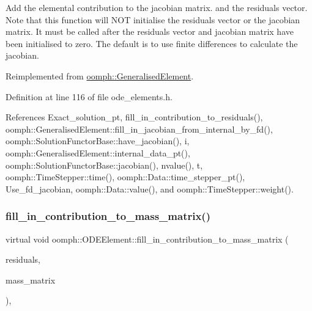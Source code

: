 Add the elemental contribution to the jacobian matrix. and the residuals vector. Note that this function will N\+OT initialise the residuals vector or the jacobian matrix. It must be called after the residuals vector and jacobian matrix have been initialised to zero. The default is to use finite differences to calculate the jacobian. 



Reimplemented from \hyperlink{classoomph_1_1GeneralisedElement_a6ae09fc0d68e4309ac1b03583d252845}{oomph\+::\+Generalised\+Element}.



Definition at line 116 of file ode\+\_\+elements.\+h.



References Exact\+\_\+solution\+\_\+pt, fill\+\_\+in\+\_\+contribution\+\_\+to\+\_\+residuals(), oomph\+::\+Generalised\+Element\+::fill\+\_\+in\+\_\+jacobian\+\_\+from\+\_\+internal\+\_\+by\+\_\+fd(), oomph\+::\+Solution\+Functor\+Base\+::have\+\_\+jacobian(), i, oomph\+::\+Generalised\+Element\+::internal\+\_\+data\+\_\+pt(), oomph\+::\+Solution\+Functor\+Base\+::jacobian(), nvalue(), t, oomph\+::\+Time\+Stepper\+::time(), oomph\+::\+Data\+::time\+\_\+stepper\+\_\+pt(), Use\+\_\+fd\+\_\+jacobian, oomph\+::\+Data\+::value(), and oomph\+::\+Time\+Stepper\+::weight().

\mbox{\label{classoomph_1_1ODEElement_aef001ba04ec222921cbdf887ddc6b041}} 
\subsubsection{\texorpdfstring{fill\+\_\+in\+\_\+contribution\+\_\+to\+\_\+mass\+\_\+matrix()}{fill\_in\_contribution\_to\_mass\_matrix()}}
{\footnotesize\ttfamily virtual void oomph\+::\+O\+D\+E\+Element\+::fill\+\_\+in\+\_\+contribution\+\_\+to\+\_\+mass\+\_\+matrix (\begin{DoxyParamCaption}\item[{\hyperlink{classoomph_1_1Vector}{Vector}$<$ double $>$ \&}]{residuals,  }\item[{\hyperlink{classoomph_1_1DenseMatrix}{Dense\+Matrix}$<$ double $>$ \&}]{mass\+\_\+matrix }\end{DoxyParamCaption})\hspace{0.3cm}{\ttfamily [inline]}, {\ttfamily [virtual]}}



